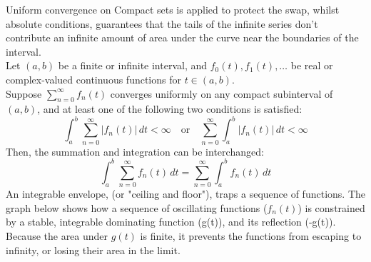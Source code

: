 \documentclass[a4paper, 10pt, onepage]{elegantbook}
\begin{document}
Uniform convergence on Compact sets is applied to protect the swap, whilst absolute conditions, guarantees that the tails of the infinite series don't contribute an infinite amount of area under the curve near the boundaries of the interval.  \\

Let $(a,b)$ be a finite or infinite interval, and $f_0(t), f_1(t), \ldots$ be real or complex-valued continuous functions for $t \in (a,b)$.  \\

Suppose $\sum_{n=0}^\infty f_n(t)$ converges uniformly on any compact subinterval of $(a,b)$, and at least one of the following two conditions is satisfied:  \\
\[
\int_a^b \sum_{n=0}^\infty |f_n(t)| \, dt < \infty \quad \text{or} \quad \sum_{n=0}^\infty \int_a^b |f_n(t)| \, dt < \infty
\]
Then, the summation and integration can be interchanged:
\[
\int_a^b \sum_{n=0}^\infty f_n(t) \, dt = \sum_{n=0}^\infty \int_a^b f_n(t) \, dt
\]
\noindent
 An integrable envelope, (or "ceiling and floor"), traps a sequence of functions. The graph below shows how a sequence of oscillating functions ($f_n(t)$) is constrained by a stable, integrable dominating function (g(t)), and its reflection (-g(t)).  \\

Because the area under \(g(t)\) is finite, it prevents the functions from escaping to infinity, or losing their area in the limit.  \\
\end{document}
